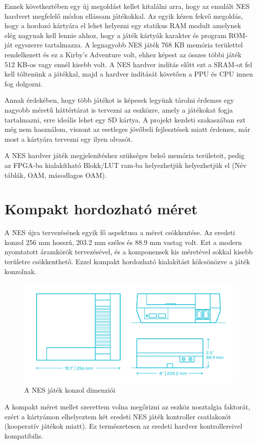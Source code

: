 Ennek következtében egy új megoldást kellet kitalálni arra, hogy az emulált NES hardvert megfelelő módon ellássam játékokkal. Az egyik kézen fekvő megoldás, hogy a hordozó kártyára el lehet helyezni egy statikus RAM modult amelynek elég nagynak kell lennie ahhoz, hogy a játék kártyák karakter és program ROM-ját egyszerre tartalmazza. A legnagyobb NES játék 768 KB memória területtel rendelkezett és ez a Kirby's Adventure volt, ehhez képest az összes többi játék 512 KB-os vagy ennél kisebb volt. A NES hardver indítás előtt ezt a SRAM-ot fel kell töltenünk a játékkal, majd a hardver indítását követően a PPU és CPU innen fog dolgozni.

Annak érdekében, hogy több játékot is képesek legyünk tárolni érdemes egy nagyobb méretű háttértárat is tervezni az eszközre, amely a játékokat fogja tartalmazni, erre ideális lehet egy SD kártya. A projekt kezdeti szakaszában ezt még nem használom, viszont az esetleges jövőbeli fejlesztések miatt érdemes, már most a kártyára tervezni egy ilyen olvasót.

A NES hardver játék megjelenítéshez szükséges belső memória területeit, pedig az FPGA-ba kialakítható Blokk/LUT ram-ba helyezhetjük helyezhetjük el (Név táblák, OAM, másodlagos OAM).

\section{Kompakt hordozható méret}
\label{sec:Size}

A NES újra tervezésének egyik fő aspektusa a méret csökkentése. Az eredeti konzol 256 mm hosszú, 203.2 mm széles és 88.9 mm vastag volt. Ezt a modern nyomtatott áramkörök tervezésével, és a komponensek kis méretével sokkal kisebb területre csökkenthető. Ezzel kompakt hordozható kialakítást kölcsönözve a játék konzolnak.

\begin{figure}[H]
	\centering
	\includegraphics[width=150mm, keepaspectratio]{figures/NES-size}
	\caption{A NES játék konzol dimenziói}
	\label{fig:NES-size}
\end{figure}

A kompakt méret mellet szerettem volna megőrizni az eszköz nosztalgia faktorát, ezért a kártyámon elhelyeztem két eredeti NES játék kontroller csatlakozót (kooperatív játékok miatt). Ez természetesen az eredeti hardver kontrollereivel kompatibilis.


